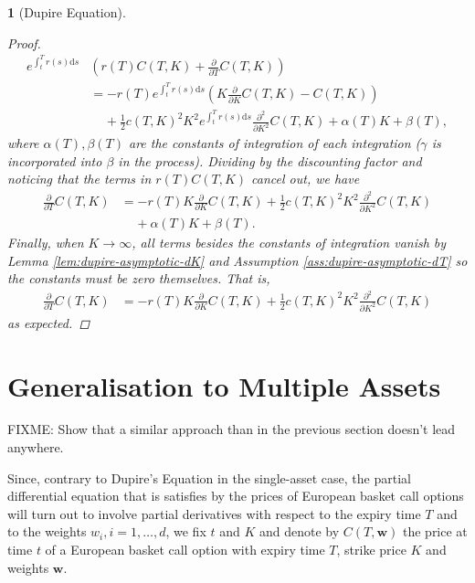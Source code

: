 \documentclass[english]{article}
\numberwithin{equation}{section}
\numberwithin{figure}{section}
\theoremstyle{bolddescit}
\newtheorem{theorem}{\protect\theoremname}[section]
\theoremstyle{definition}
\theoremstyle{definition}
\theoremstyle{plain}
\theoremstyle{plain}
\theoremstyle{bolddesc}
\theoremstyle{plain}
\theoremstyle{remark}
\providecommand{\theoremname}{Theorem}
\begin{document}
\begin{theorem}[Dupire Equation]
\begin{proof}
    \begin{align*}
      e^{\int_t^T r(s) \mathrm{d}s} &\left(r(T) C(T,K) + \frac{\partial}{\partial T}C(T,K)\right)\\
      &= - r(T) e^{\int_t^T r(s) \mathrm{d}s} \left( K \frac{\partial}{\partial K} C(T,K) - C(T,K) \right)\\
        &\ \ \ \ \ + \frac{1}{2} c(T,K)^2 K^2 e^{\int_t^T r(s) \mathrm{d}s}\frac{\partial^2}{\partial K^2} C(T,K) + \alpha(T) K + \beta(T),
    \end{align*}
    where $\alpha(T), \beta(T)$ are the constants of integration of each integration ($\gamma$ is incorporated into $\beta$ in the process). Dividing by the discounting factor and noticing that the terms in $r(T)C(T,K)$ cancel out, we have
    \begin{align*}
      \frac{\partial}{\partial T}C(T,K)
      &= - r(T) K \frac{\partial}{\partial K} C(T,K)
        + \frac{1}{2} c(T,K)^2 K^2 \frac{\partial^2}{\partial K^2} C(T,K)\\
        &\ \ \ \ \ + \alpha(T) K + \beta(T).
    \end{align*}
    Finally, when $K \to \infty$, all terms besides the constants of integration vanish by Lemma \ref{lem:dupire-asymptotic-dK} and Assumption \ref{ass:dupire-asymptotic-dT} so the constants must be zero themselves. That is,
    \begin{align*}
      \frac{\partial}{\partial T}C(T,K)
      &= - r(T) K \frac{\partial}{\partial K} C(T,K)
        + \frac{1}{2} c(T,K)^2 K^2 \frac{\partial^2}{\partial K^2} C(T,K)
    \end{align*}
    as expected.
  \end{proof}
\end{theorem}

\section{Generalisation to Multiple Assets}


FIXME: Show that a similar approach than in the previous section doesn't lead anywhere.

Since, contrary to Dupire's Equation in the single-asset case, the partial differential equation that is satisfies by the prices of European basket call options will turn out to involve partial derivatives with respect to the expiry time $T$ and to the weights $w_i, i=1,\ldots,d$, we fix $t$ and $K$ and denote by $C(T,\mathbf{w})$ the price at time $t$ of a European basket call option with expiry time $T$, strike price $K$ and weights $\mathbf{w}$.
\end{document}
